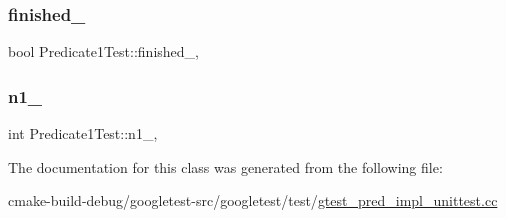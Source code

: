 \mbox{\label{classPredicate1Test_a6d45fb2d1f01a5c8baf28f60039c244e}} 
\subsubsection{\texorpdfstring{finished\_}{finished\_}}
{\footnotesize\ttfamily bool Predicate1\+Test\+::finished\+\_\+\hspace{0.3cm}{\ttfamily [static]}, {\ttfamily [protected]}}

\mbox{\label{classPredicate1Test_a528d9f7f618b17802962a3824eea11e3}} 
\subsubsection{\texorpdfstring{n1\_}{n1\_}}
{\footnotesize\ttfamily int Predicate1\+Test\+::n1\+\_\+\hspace{0.3cm}{\ttfamily [static]}, {\ttfamily [protected]}}



The documentation for this class was generated from the following file\+:\begin{DoxyCompactItemize}
\item 
cmake-\/build-\/debug/googletest-\/src/googletest/test/\mbox{\hyperlink{gtest__pred__impl__unittest_8cc}{gtest\+\_\+pred\+\_\+impl\+\_\+unittest.\+cc}}\end{DoxyCompactItemize}
